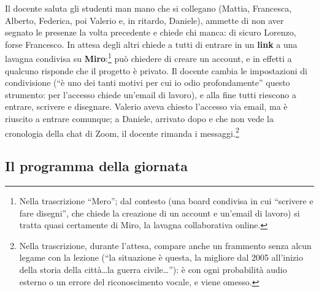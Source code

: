 Il docente saluta gli studenti man mano che si collegano (Mattia, Francesca,
Alberto, Federica, poi Valerio e, in ritardo, Daniele), ammette di non aver
segnato le presenze la volta precedente e chiede chi manca: di sicuro
Lorenzo, forse Francesco. In attesa degli altri chiede a tutti di entrare in
un \textbf{link} a una lavagna condivisa su \textbf{Miro}:\footnote{Nella
trascrizione ``Mero''; dal contesto (una board condivisa in cui ``scrivere e
fare disegni'', che chiede la creazione di un account e un'email di lavoro)
si tratta quasi certamente di Miro, la lavagna collaborativa online.} può
chiedere di creare un account, e in effetti a qualcuno risponde che il
progetto è privato. Il docente cambia le impostazioni di condivisione (``è
uno dei tanti motivi per cui io odio profondamente'' questo strumento: per
l'accesso chiede un'email di lavoro), e alla fine tutti riescono a entrare,
scrivere e disegnare. Valerio aveva chiesto l'accesso via email, ma è
riuscito a entrare comunque; a Daniele, arrivato dopo e che non vede la
cronologia della chat di Zoom, il docente rimanda i messaggi.\footnote{Nella
trascrizione, durante l'attesa, compare anche un frammento senza alcun
legame con la lezione (``la situazione è questa, la migliore dal 2005
all'inizio della storia della città\ldots la guerra civile\ldots''): è con
ogni probabilità audio esterno o un errore del riconoscimento vocale, e viene
omesso.}

\subsection{Il programma della giornata}

